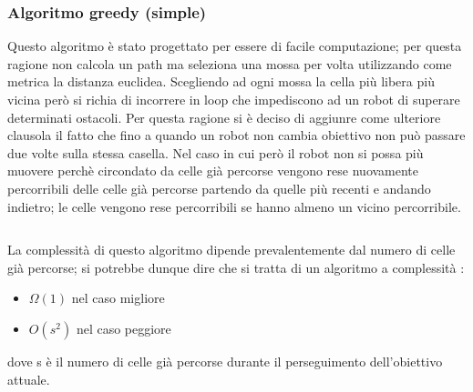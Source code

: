  \subsubsection{Algoritmo greedy (simple)}
  \label{complgreedy}
    Questo algoritmo è stato progettato per essere di facile computazione; per questa ragione non calcola un path
    ma seleziona una mossa per volta utilizzando come metrica la distanza euclidea. Scegliendo ad ogni mossa
    la cella più libera più vicina però si richia di incorrere in loop che impediscono ad un robot di superare
    determinati ostacoli. Per questa ragione si è deciso di aggiunre come ulteriore clausola il fatto che fino a 
    quando un robot non cambia obiettivo non può passare due volte sulla stessa casella.
    Nel caso in cui però il robot non si possa più muovere perchè circondato da celle già percorse vengono rese
    nuovamente percorribili delle celle già percorse partendo da quelle più recenti e andando indietro; le celle vengono
    rese percorribili se hanno almeno un vicino percorribile.
    \inputminted[linenos, fontsize=\footnotesize]{python}{algoritmi/simple.py}
    La complessità di questo algoritmo dipende prevalentemente dal numero di celle già percorse; si potrebbe dunque
    dire che si tratta di un algoritmo a complessità : 
    \begin{itemize}
      \item $\Omega(1)$ nel caso migliore
      \item $O(s^2)$ nel caso peggiore  
    \end{itemize}
    dove s è il numero di celle già percorse durante il perseguimento dell'obiettivo attuale.
    
